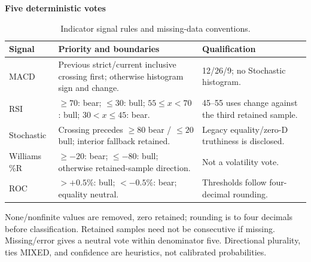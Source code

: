 \begin{table}[!htb]
\centering\small
\setlength{\tabcolsep}{3pt}
\renewcommand{\arraystretch}{1.15}
\caption{Indicator signal rules and missing-data conventions.}
\label{tab:indicator_rules}
\textbf{Five deterministic votes}\par\smallskip
\begin{tabular}{lp{7.1cm}p{5.2cm}}
\hline
Signal & Priority and boundaries & Qualification \\
\hline
MACD & Previous strict/current inclusive crossing first; otherwise histogram sign and change. & 12/26/9; no Stochastic histogram. \\
RSI & $\ge70$: bear; $\le30$: bull; $55\le x<70$: bull; $30<x\le45$: bear. & 45--55 uses change against the third retained sample. \\
Stochastic & Crossing precedes $\ge80$ bear / $\le20$ bull; interior fallback retained. & Legacy equality/zero-D truthiness is disclosed. \\
Williams \%R & $\ge-20$: bear; $\le-80$: bull; otherwise retained-sample direction. & Not a volatility vote. \\
ROC & $>+0.5\%$: bull; $<-0.5\%$: bear; equality neutral. & Thresholds follow four-decimal rounding. \\
\hline
\end{tabular}\par\medskip
\begin{minipage}{\textwidth}\footnotesize None/nonfinite values are removed, zero retained; rounding is to four decimals before classification. Retained samples need not be consecutive if missing. Missing/error gives a neutral vote within denominator five. Directional plurality, ties MIXED, and confidence are heuristics, not calibrated probabilities.\end{minipage}
\end{table}
